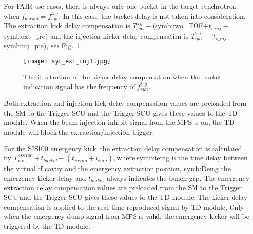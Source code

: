 For FAIR use cases, there is always only one bucket in the target synchrotron when $f_{\mathit{bucket}}=f_{\mathit{syn}}^{\mathit{trg}}$. In this case, the bucket delay is not taken into consideration. The extraction kick delay compensation is $T_{\mathit{syn}}^{\mathit{trg}} -$(\gls{symb:two_TOF}$ + t_{v\_inj}+ $\gls{symb:ext_pre}) and the injection kicker delay compensation is $T_{\mathit{syn}}^{\mathit{trg}} - (t_{v\_inj}+ $\gls{symb:inj_pre}), see Fig.~\ref{ext_inj_kicker1}. 
\begin{figure}[!htb]
   \centering   
   \texttt{[image: syc\_ext\_inj1.jpg]}
   \caption{The illustration of the kicker delay compensation when the bucket indication signal has the frequency of $f_{\mathit{syn}}^{\mathit{trg}}$.}
   \label{ext_inj_kicker1}
\end{figure}



Both extraction and injection kick delay compensation values are preloaded from the SM to the Trigger SCU and the Trigger SCU gives these values to the TD module. When the beam injection inhibit signal from the MPS is on, the TD module will block the extraction/injection trigger.

For the SIS100 emergency kick, the extraction delay compensation is calculated by $T_{\mathit{rev}}^{\mathit{SIS100}} + t_{bucket} - (t_{v\_emg} + t_{emg})$, where \gls{symb:temg} is the time delay between the virtual rf cavity and the emergency extraction position, \gls{symb:Demg} the emergency kicker delay and $t_{bucket}$ always indicates the bunch gap. The emergency extraction delay compensation values are preloaded from the SM to the Trigger SCU and the Trigger SCU gives these values to the TD module. The kicker delay compensation is applied to the real-time reproduced signal by TD module. Only when the emergency dump signal from MPS is valid, the emergency kicker will be triggered by the TD module.


